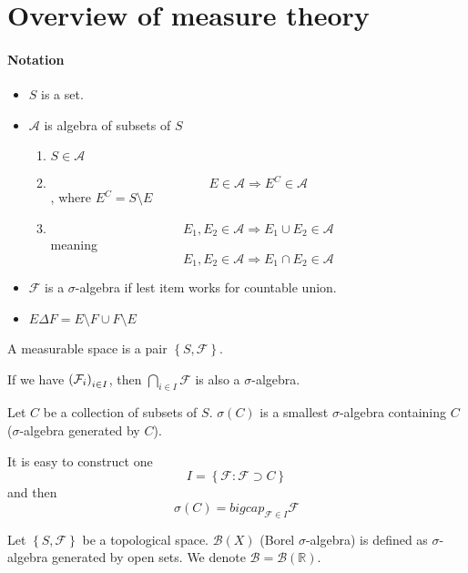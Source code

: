\section{Overview of measure theory}
\paragraph{Notation}
\begin{itemize}
	\item $S$ is a set.
	\item $\mathcal{A}$ is algebra of subsets of $S$
	\begin{enumerate}
		\item $S\in \mathcal{A}$
		\item $$E\in \mathcal{A} \Rightarrow E^C\in \mathcal{A}$$, where $E^C = S \setminus E$
		\item $$E_1, E_2 \in \mathcal{A} \Rightarrow E_1 \cup E_2 \in \mathcal{A}$$
		meaning
		$$E_1, E_2 \in \mathcal{A} \Rightarrow E_1 \cap E_2 \in \mathcal{A}$$
	\end{enumerate}
\item $\mathcal{F}$ is a $\sigma$-algebra if lest item works for countable union.
\item $E\Delta F = E\setminus F \cup F \setminus E$ 
\end{itemize}

\begin{definition}
	A measurable space is a pair $\left\{S,\mathcal{F}\right\}$.
\end{definition}

\begin{prop}
	If we have $\qty(\mathcal{F}_i)_{i\in I}$, then $\bigcap_{i\in I} \mathcal{F} $ is also a $\sigma$-algebra.
\end{prop}

\begin{definition}
	Let $C$ be a collection of subsets of $S$. $\sigma(C)$ is a smallest $\sigma$-algebra containing $C$ ($\sigma$-algebra generated by $C$).
	
	It is easy to construct one
	$$I = \left\{ \mathcal{F} :\mathcal{F} \supset C \right\}$$
	and then
	$$\sigma(C) = bigcap_{\mathcal{F}\in I} \mathcal{F}$$
\end{definition}

\begin{definition}
	Let $\left\{S,\mathcal{F}\right\}$ be a topological space. $\mathcal{B}(X)$ (Borel $\sigma$-algebra) is defined as $\sigma$-algebra generated by open sets. We denote
	$\mathcal{B} = \mathcal{B}(\mathbb{R})$.
\end{definition}
